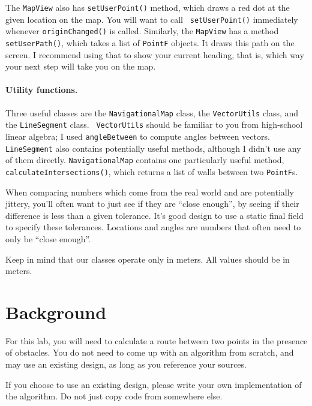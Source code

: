 \documentclass[10pt]{article}
\begin{document}
The {\tt MapView} also has {\tt setUserPoint()} method, which draws a
red dot at the given location on the map. You will want to call {\tt
  setUserPoint()} immediately whenever {\tt originChanged()} is
called. Similarly, the {\tt MapView} has a method {\tt setUserPath()},
which takes a list of {\tt PointF} objects. It draws this path on the
screen. I recommend using that to show your current heading, that is,
which way your next step will take you on the map.


\paragraph{Utility functions.} Three useful classes are the {\tt NavigationalMap} class,
the {\tt VectorUtils} class, and the {\tt LineSegment} class. {\tt
  VectorUtils} should be familiar to you from high-school linear
algebra; I used {\tt angleBetween} to compute angles between
vectors. {\tt LineSegment} also contains potentially useful methods,
although I didn't use any of them directly. {\tt NavigationalMap}
contains one particularly useful method, {\tt
  calculateIntersections()}, which returns a list of walls between two
{\tt PointF}s.

When comparing numbers which come from the real world and are
potentially jittery, you'll often want to just see if they are ``close
enough'', by seeing if their difference is less than a given
tolerance. It's good design to use a static final field to specify
these tolerances. Locations and angles are numbers that often need to only be
``close enough''.

Keep in mind that our classes operate only in meters. All values should be in meters.

\section{Background}
For this lab, you will need to calculate a route between two points in the presence of obstacles. You do not need to come up with an algorithm from scratch, and may use an existing design, as long as you reference your sources. 

If you choose to use an existing design, please write your own implementation of the algorithm. Do not just copy code from somewhere else.

\end{document}
